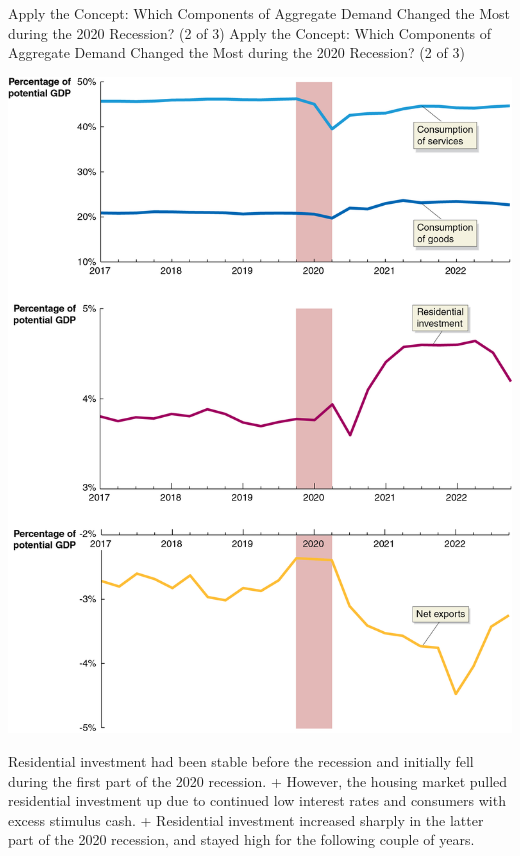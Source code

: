 \documentclass[
  12pt,
  ignorenonframetext,
]{beamer}
\begin{document}
\begin{frame}{Apply the Concept: Which Components of Aggregate Demand
Changed the Most during the 2020 Recession? (2 of 3)}
\protect\hypertarget{apply-the-concept-which-components-of-aggregate-demand-changed-the-most-during-the-2020-recession-2-of-3}{}
Apply the Concept: Which Components of Aggregate Demand Changed the Most
during the 2020 Recession? (2 of 3)

\includegraphics[width=\textwidth,height=0.99\textheight]{imgs3/img_slide18a.png}

Residential investment had been stable before the recession and
initially fell during the first part of the 2020 recession. + However,
the housing market pulled residential investment up due to continued low
interest rates and consumers with excess stimulus cash. + Residential
investment increased sharply in the latter part of the 2020 recession,
and stayed high for the following couple of years.
\end{frame}
\end{document}
